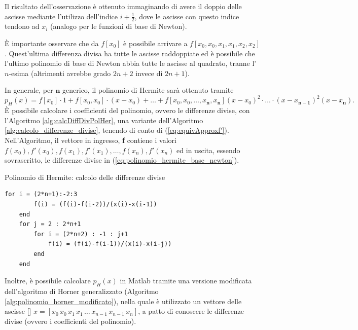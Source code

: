 Il risultato dell'osservazione è ottenuto immaginando di avere il doppio delle ascisse mediante l'utilizzo dell'indice $i+\frac{1}{2}$, dove le ascisse con questo indice tendono ad $x_i$ (analogo per le funzioni di base di Newton).
    
È importante osservare che da $f[x_0]$ è possibile arrivare a $f[x_0,x_0,x_1,x_1,x_2,x_2]$. Quest'ultima differenza divisa ha tutte le ascisse raddoppiate ed è possibile che l'ultimo polinomio di base di Newton abbia tutte le ascisse al quadrato, tranne l'$n$-esima (altrimenti avrebbe grado $2n+2$ invece di $2n+1$).

\begin{remark}
    In generale, per $\boldsymbol n$ generico, il polinomio di Hermite sarà ottenuto tramite 
    \begin{equation}\label{eq:polinomio_hermite_base_newton}
        p_H(x)=f[x_0]\cdot 1 + f[x_0,x_0]\cdot(x-x_0)+\hdots+f[x_0,x_0,\hdots,x_{\boldsymbol n},x_{\boldsymbol n}](x-x_0)^2\cdot\hdots\cdot(x-x_{\boldsymbol{n-1}})^2(x-x_{\boldsymbol n}).
    \end{equation}
    È possibile calcolare i coefficienti del polinomio, ovvero le differenze divise, con l'Algoritmo \ref{alg:calcDiffDivPolHer}, una variante dell'Algoritmo \ref{alg:calcolo_differenze_divise}, tenendo di conto di (\ref{eq:equivApproxf'}). Nell'Algoritmo, il vettore in ingresso, \textbf{f} contiene i valori $f(x_0), f'(x_0), f(x_1), f'(x_1),\hdots, f(x_n),f'(x_n)$ ed in uscita, essendo sovrascritto, le differenze divise in (\ref{eq:polinomio_hermite_base_newton}).
\end{remark}
\begin{algorithm}
\caption{Polinomio di Hermite: calcolo delle differenze divise}\label{alg:calcDiffDivPolHer}
    \begin{lstlisting}[style=Matlab-editor]
    for i = (2*n+1):-2:3
        f(i) = (f(i)-f(i-2))/(x(i)-x(i-1))
    end
    for j = 2 : 2*n+1
        for i = (2*n+2) : -1 : j+1
            f(i) = (f(i)-f(i-1))/(x(i)-x(i-j))
        end
    end
    \end{lstlisting}
\end{algorithm}

Inoltre, è possibile calcolare $p_H(x)$ in Matlab tramite una versione modificata dell'algoritmo di Horner generalizzato (Algoritmo \ref{alg:polinomio_horner_modificato}), nella quale è utilizzato un vettore delle ascisse [\footnotemark] $x=[x_0\, x_0\, x_1\, x_1\, \hdots\, x_{n-1}\, x_{n-1}\,x_n]$, a patto di conoscere le differenze divise (ovvero i coefficienti del polinomio). 

